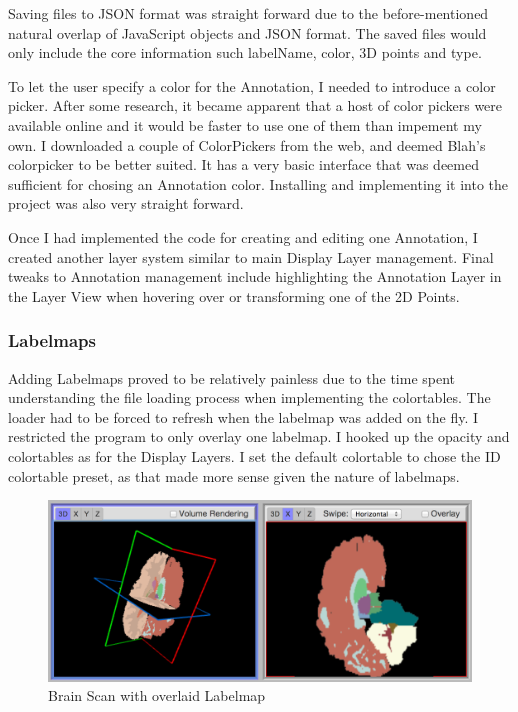 \documentclass[a4paper,11pt,titlepage]{article}
\begin{document}
Saving files to JSON format was straight forward due to the before-mentioned natural overlap of JavaScript objects and JSON format. The saved files would only include the core information such labelName, color, 3D points and type.

To let the user specify a color for the Annotation, I needed to introduce a color picker. After some research, it became apparent that a host of color pickers were available online and it would be faster to use one of them than impement my own. I downloaded a couple of ColorPickers from the web, and deemed Blah's colorpicker to be better suited. It has a very basic interface that was deemed sufficient for chosing an Annotation color. Installing and implementing it into the project was also very straight forward.

Once I had implemented the code for creating and editing one Annotation, I created another layer system similar to main Display Layer management. Final tweaks to Annotation management include highlighting the Annotation Layer in the Layer View when hovering over or transforming one of the 2D Points.


\subsubsection{Labelmaps}

Adding Labelmaps proved to be relatively painless due to the time spent understanding the file loading process when implementing the colortables. The loader had to be forced to refresh when the labelmap was added on the fly. I restricted the program to only overlay one labelmap. I hooked up the opacity and colortables as for the Display Layers. I set the default colortable to chose the ID colortable preset, as that made more sense given the nature of labelmaps.

\begin{figure}[ht!]
\centering
\includegraphics[width=170mm]{graphics/Labelmap_01.png}
\caption{Brain Scan with overlaid Labelmap}
\label{fig:UIdesign1}
\end{figure}
\end{document}
